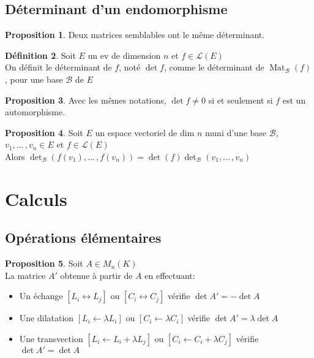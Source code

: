 \documentclass[10pt,a4paper]{article}
\theoremstyle{definition}
\newtheorem{proposition}{Proposition}[section]
\newtheorem{definition}[proposition]{Définition}
\DeclareMathOperator{\mat}{Mat}
\begin{document}
\subsection{Déterminant d'un endomorphisme}
\begin{proposition}
Deux matrices semblables ont le même déterminant.
\end{proposition}
\begin{definition}
Soit $E$ un ev de dimension $n$ et $f \in \mathcal{L}(E)$ \\
On définit le déterminant de $f$, noté $\det f$, comme le déterminant de $\mat_\mathcal{B}(f)$, pour une base $\mathcal{B}$ de $E$
\end{definition}
\begin{proposition}
Avec les mêmes notations, $\det f \neq 0$ si et seulement si $f$ est un automorphisme.
\end{proposition}
\begin{proposition}
Soit $E$ un espace vectoriel de dim $n$ muni d'une base $\mathcal{B}$, $v_1, ...\,, v_n \in E$ et $f \in \mathcal{L}(E)$ \\
Alors $\det_\mathcal{B}(f(v_1), ...\,, f(v_n)) = \det(f) \det_\mathcal{B}(v_1, ...\,, v_n)$
\end{proposition}

\section{Calculs}
\subsection{Opérations élémentaires}
\begin{proposition}
Soit $A \in M_n(K)$ \\
La matrice $A'$ obtenue à partir de $A$ en effectuant:
\begin{itemize}
\item Un échange $[L_i \leftrightarrow L_j]$ ou $[C_i \leftrightarrow C_j]$ vérifie $\det A' = -\det A$
\item Une dilatation $[L_i \leftarrow \lambda L_i]$ ou $[C_i \leftarrow \lambda C_i]$ vérifie $\det A' = \lambda \det A$
\item Une transvection $[L_i \leftarrow L_i + \lambda L_j]$ ou $[C_i \leftarrow C_i + \lambda C_j]$ vérifie $\det A' = \det A$
\end{itemize}
\end{proposition}

\pagebreak
\end{document}
